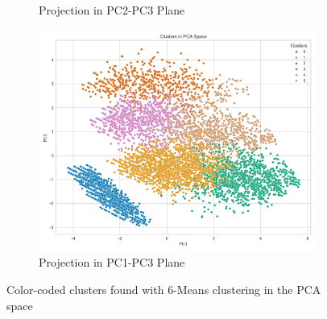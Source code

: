 \documentclass[a4paper,11pt]{article}
\begin{document}
\begin{figure}[h]
\begin{subfigure}{0.32\linewidth}
        \caption{Projection in PC2-PC3 Plane}
        \label{fig:cluster_23}
    \end{subfigure}
    \hfill
    \begin{subfigure}{0.32\linewidth}
        \includegraphics[width=\textwidth]{figures/clustering/6-means_pca_13.png}
        \caption{Projection in PC1-PC3 Plane}
        \label{fig:cluster_13}
    \end{subfigure}
    \caption{Color-coded clusters found with 6-Means clustering in the PCA space}
    \label{fig:clusters_pca}
\end{figure}
\end{document}
